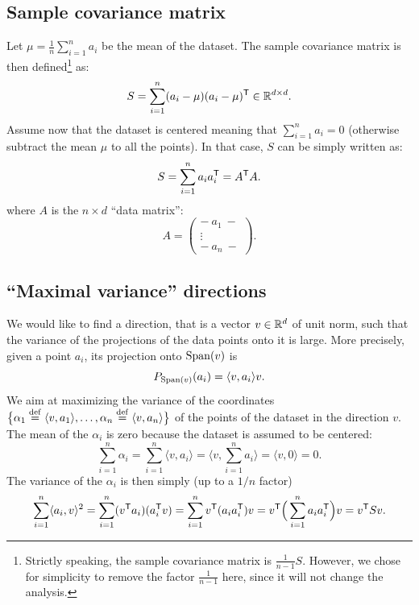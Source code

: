 \documentclass[11pt,nocut]{article}
\begin{document}
\subsection{Sample covariance matrix}

Let $\mu = \frac{1}{n} \sum_{i=1}^n a_i$ be the mean of the dataset. The sample covariance matrix is then defined\footnote{Strictly speaking, the sample covariance matrix is $\frac{1}{n-1}S$. However, we chose for simplicity to remove the factor $\frac{1}{n-1}$ here, since it will not change the analysis.} as:
$$
S = \sum_{i=1}^n (a_i - \mu) (a_i-\mu)^{{\sf T}} \in \mathbb{R}^{d \times d}.
$$
Assume now that the dataset is centered meaning that $\sum_{i=1}^n a_i = 0$ (otherwise subtract the mean $\mu$ to all the points). In that case, $S$ can be simply written as:
$$
S = \sum_{i=1}^n a_i a_i^{{\sf T}}
= A^{{\sf T}} A.
$$
where $A$ is the $n\times d$ ``data matrix'':
$$
A =
\begin{pmatrix}
	- \ a_1 \ - \\
	  \vdots  \\
	- \ a_n \ -
\end{pmatrix}
.
$$


\subsection{``Maximal variance'' directions}\label{sec:maximal_variance}


We would like to find a direction, that is a vector $v \in \mathbb{R}^d$ of unit norm, such that the variance of the projections of the data points onto it is large. More precisely, given a point $a_i$, its projection onto ${{\rm Span}}(v)$ is
$$
P_{{{\rm Span}}(v)}(a_i) = 
\langle v, a_i \rangle v.
$$
We aim at maximizing the variance of the coordinates $\big\{ \alpha_1 \overset{\rm def}{=} \langle v, a_1 \rangle, \dots , \alpha_n \overset{\rm def}{=} \langle v, a_n \rangle \big\}$ of the points of the dataset in the direction $v$. 
The mean of the $\alpha_i$ is zero because the dataset is assumed to be centered:
$$
\sum_{i=1}^n \alpha_i 
=
\sum_{i=1}^n \langle v, a_i \rangle
= \Big\langle v, \sum_{i=1}^n a_i \Big\rangle = \langle v,0 \rangle = 0.
$$
The variance of the $\alpha_i$ is then simply (up to a $1/n$ factor)
$$
\sum_{i=1}^n \langle a_i, v \rangle^2
=
\sum_{i=1}^n (v^{{\sf T}}a_i)(a_i^{{\sf T}} v)
=
\sum_{i=1}^n v^{{\sf T}} (a_i a_i^{{\sf T}}) v
=
v^{{\sf T}} \Big(\sum_{i=1}^n a_i a_i^{{\sf T}}\Big) v
= v^{{\sf T}} S v.
$$
\end{document}

